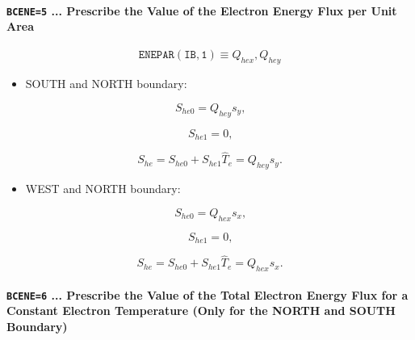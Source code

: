 \documentclass[11pt]{article}
\begin{document}
\bigskip

\paragraph{\texttt{BCENE=5} ... Prescribe the Value of the Electron Energy
Flux per Unit Area}

\bigskip

\begin{equation*}
\mathtt{ENEPAR(IB,1)}\equiv Q_{hex},Q_{hey}
\end{equation*}

\bigskip

\begin{itemize}
\item  SOUTH and NORTH boundary:
\end{itemize}

\begin{equation}
S_{he0}=Q_{hey}s_{y}\text{,}   \label{c205}
\end{equation}

\begin{equation}
S_{he1}=0\text{,}   \label{c206}
\end{equation}

\begin{equation}
S_{he}=S_{he0}+S_{he1}\widehat{T}_{e}=Q_{hey}s_{y}\text{.}   \label{c207}
\end{equation}

\bigskip

\begin{itemize}
\item  WEST and NORTH boundary:
\end{itemize}

\begin{equation}
S_{he0}=Q_{hex}s_{x}\text{,}   \label{c208}
\end{equation}

\begin{equation}
S_{he1}=0\text{,}   \label{c209}
\end{equation}

\begin{equation}
S_{he}=S_{he0}+S_{he1}\widehat{T}_{e}=Q_{hex}s_{x}\text{.}   \label{c210}
\end{equation}

\bigskip

\paragraph{\texttt{BCENE=6} ... Prescribe the Value of the Total Electron
Energy Flux for a Constant Electron Temperature (Only for the NORTH and
SOUTH Boundary)}
\end{document}
